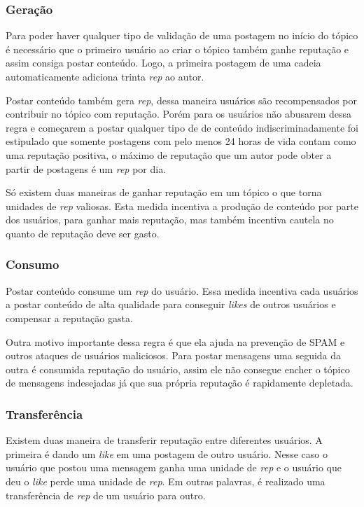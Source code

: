\documentclass[12pt]{article}
\begin{document}
\subsubsection{Geração} \label{subsubsec:geracao}

Para poder haver qualquer tipo de validação de uma postagem no início do tópico é necessário que o primeiro usuário ao criar o tópico também ganhe reputação e assim consiga postar conteúdo. Logo, a primeira postagem de uma cadeia automaticamente adiciona trinta \emph{rep} ao autor. 

Postar conteúdo também gera \emph{rep}, dessa maneira usuários são recompensados por contribuir no tópico com reputação. Porém para os usuários não abusarem dessa regra e começarem a postar qualquer tipo de de conteúdo indiscriminadamente foi estipulado que somente postagens com pelo menos 24 horas de vida contam como uma reputação positiva, o máximo de reputação que um autor pode obter a partir de postagens é um \emph{rep} por dia. 

Só existem duas maneiras de ganhar reputação em um tópico o que torna unidades de \emph{rep} valiosas. Esta medida incentiva a produção de conteúdo por parte dos usuários, para ganhar mais reputação, mas também incentiva cautela no quanto de reputação deve ser gasto.  

\subsubsection{Consumo} \label{subsubsec:consumo}

Postar conteúdo consume um \emph{rep} do usuário. Essa medida incentiva cada usuários a postar conteúdo de alta qualidade para conseguir \emph{likes} de outros usuários e compensar a reputação gasta.

Outra motivo importante dessa regra é que ela ajuda na prevenção de SPAM e outros ataques de usuários maliciosos. Para postar mensagens uma seguida da outra é consumida reputação do usuário, assim ele não consegue encher o tópico de mensagens indesejadas já que sua própria reputação é rapidamente depletada. 

\subsubsection{Transferência} \label{subsubsec:transfe}

Existem duas maneira de transferir reputação entre diferentes usuários. A primeira é dando um \emph{like} em uma postagem de outro usuário. Nesse caso o usuário que postou uma mensagem ganha uma unidade de \emph{rep} e o usuário que deu o \emph{like} perde uma unidade de \emph{rep}. Em outras palavras, é realizado uma transferência de \emph{rep} de um usuário para outro. 
\end{document}
